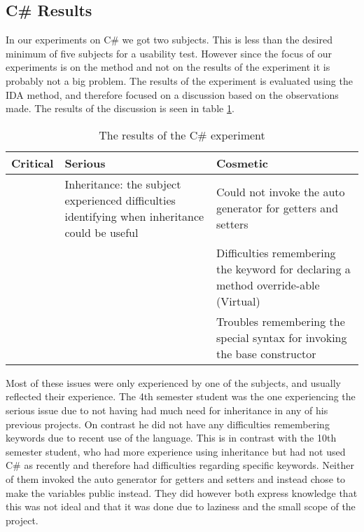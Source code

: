 \subsection{C\# Results}
In our experiments on C\# we got two subjects. This is less than the desired minimum of five subjects for a usability test. However since the focus of our experiments is on the method and not on the results of the experiment it is probably not a big problem. The results of the experiment is evaluated using the IDA method, and therefore focused on a discussion based on the observations made. The results of the discussion is seen in table \ref{C-usability-results}.

\begin{table} []
\caption{The results of the C\# experiment}
\centering
\renewcommand{\arraystretch}{1.5}
\label{C-usability-results}
\begin{tabular}{| p{5cm} | p{5cm} | p{5cm} |}
\hline
Critical & Serious     & Cosmetic \\ \hline
		 & Inheritance: the subject experienced difficulties identifying when inheritance could be useful & Could not invoke the auto generator for getters and setters \\ \hline 
		 & & Difficulties remembering the keyword for declaring a method override-able (Virtual) \\ \hline
		 & & Troubles remembering the special syntax for invoking the base constructor \\ \hline
\end{tabular}
\end{table}

Most of these issues were only experienced by one of the subjects, and usually reflected their experience.
The 4th semester student was the one experiencing the serious issue due to not having had much need for inheritance in any of his previous projects.
On contrast he did not have any difficulties remembering keywords due to recent use of the language.
This is in contrast with the 10th semester student, who had more experience using inheritance but had not used C\# as recently and therefore had difficulties regarding specific keywords.
Neither of them invoked the auto generator for getters and setters and instead chose to make the variables public instead. They did however both express knowledge that this was not ideal and that it was done due to laziness and the small scope of the project.